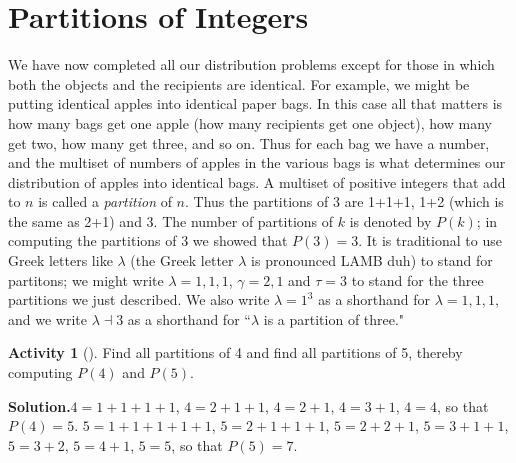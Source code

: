 \documentclass[10pt,]{book}
\theoremstyle{plain}
\theoremstyle{definition}
\newtheorem{activity}[project]{Activity}
\numberwithin{equation}{chapter}
\begin{document}
\section[{Partitions of Integers}]{Partitions of Integers}\label{section-6}
\typeout{************************************************}
\typeout{************************************************}
We have now completed all our distribution problems except for those in which both the objects and the recipients are identical. For example, we might be putting identical apples into identical paper bags. In this case all that matters is how many bags get one apple (how many recipients get one object), how many get two, how many get three, and so on. Thus for each bag we have a number, and the multiset of numbers of apples in the various bags is what determines our distribution of apples into identical bags. A multiset of positive integers that add to \(n\) is called a \emph{partition} of \(n\). Thus the partitions of 3 are 1+1+1, 1+2 (which is the same as 2+1) and 3. The number of partitions of \(k\) is denoted by \(P(k)\); in computing the partitions of 3 we showed that \(P(3) = 3\). It is traditional to use Greek letters like \(\lambda\) (the Greek letter \(\lambda\) is pronounced LAMB duh) to stand for partitons; we might write \(\lambda= 1,1,1\), \(\gamma= 2,1\) and \(\tau = 3\) to stand for the three partitions we just described. We also write \(\lambda = 1^3\) as a shorthand for \(\lambda = 1,1,1\), and we write \(\lambda \dashv 3\) as a shorthand for ``\(\lambda\) is a partition of three."%
\begin{activity}[]\label{activity-48}
Find all partitions of 4 and find all partitions of 5, thereby computing \(P(4)\) and \(P(5)\).%
\par\medskip\noindent%
\textbf{Solution.}\quad \(4=1+1+1+1\), \(4=2+1+1\), \(4=2+1\), \(4=3+1\), \(4=4\), so that \(P(4)=5\). \(5=1+1+1+1+1\), \(5=2+1+1+1\), \(5=2+2+1\), \(5=3+1+1\), \(5=3+2\), \(5=4+1\), \(5=5\), so that \(P(5)=7\).%
\end{activity}
\typeout{************************************************}
\typeout{************************************************}
\end{document}

